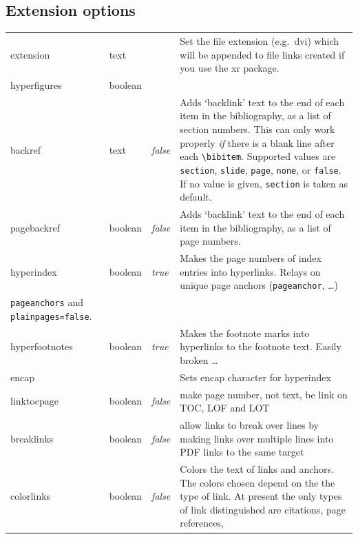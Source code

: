 \documentclass[pdftex]{article}
\begin{document}
\subsection{Extension options}
\noindent\begin{longtable}{>{\ttfamily}ll>{\itshape}lp{6cm}}
extension      & text    &         & Set the file extension (e.g.\ \textsf{dvi}) which will be appended to file links
                                     created if you use the \textsf{xr} package. \\
hyperfigures   & boolean &         & \\
backref        & text    & false   & Adds `backlink' text to the end of each item in the bibliography, as a list of
                                     section numbers. This can only work properly \emph{if} there is a blank line after
                                     each \verb|\bibitem|. Supported values are \verb|section|, \verb|slide|, \verb|page|,
                                     \verb|none|, or \verb|false|. If no value is given, \verb|section| is taken as default.\\
pagebackref    & boolean & false   & Adds `backlink' text to the end of each item in the bibliography, as a list of page
                                     numbers. \\
hyperindex     & boolean & true    & Makes the page numbers of index entries into hyperlinks. Relays on unique
                                     page anchors (\verb|pageanchor|, \ldots)\\
                                     \verb|pageanchors| and \verb|plainpages=false|. \\
hyperfootnotes & boolean & true    & Makes the footnote marks into hyperlinks to the footnote text.
                                     Easily broken \ldots\\
encap          &         &         & Sets encap character for hyperindex \\
linktocpage    & boolean & false   & make page number, not text, be link on TOC, LOF and LOT \\
breaklinks     & boolean & false   & allow links to break over lines by making links over multiple lines into PDF links to
                                     the same target \\
colorlinks     & boolean & false   & Colors the text of links and anchors. The colors chosen depend on the the type of
                                     link. At present the only types of link distinguished are citations, page references,

\end{longtable}
\end{document}
